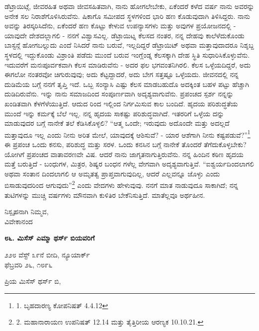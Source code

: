 ಡೆಟ್ರಾಯಿಟ್ಗೆ, ಜೀವರಹಿತ ಅಥವಾ ಜೀವಸಹಿತವಾಗಿ, ನಾನು ಹೋಗಲೇಬೇಕು, ಏಕೆಂದರೆ ಕಳೆದ ವರ್ಷ ನಾನು ಅವರನ್ನು ಅನೇಕ ಸಲ ನಿರಾಶೆಗೊಳಿಸಿರುವೆನು. ಷಿಕಾಗೊ ಸಮೀಪದ ಸ್ಥಳಗಳಿಂದ ಭಾರಿ ಹಣ ಕೊಡುವುದಾಗಿ ತಿಳಿಸಿದ್ದರು. ನಾನು ಅವನ್ನು ತಿರಸ್ಕರಿಸಿದೆನು, ಏಕೆಂದರೆ ಹಣ ಕೊಟ್ಟು ಕೇಳುವ ಉಪನ್ಯಾಸಗಳು ಮತ್ತು ಅವುಗಳ ಪ್ರಯೋಜನದಲ್ಲಿ - ಯಾವುದೇ ದೇಶದಲ್ಲಾಗಲಿ - ನನಗೆ ವಿಶ್ವಾಸವಿಲ್ಲ. ಡೆಟ್ರಾಯಿಟ್ನ ಕೆಲಸದ ನಂತರ, ನನ್ನ ದೇಹವು ಕಾಲೆಳೆದುಕೊಂಡು ಬಾಸ್ಟನ್ಗೆ ಹೋಗಬಲ್ಲುದು ಎಂದೆ ನಿಸಿದರೆ ನಾನು ಬರುವೆ, ಇಲ್ಲದಿದ್ದರೆ ಡೆಟ್ರಾಯಿಟ್ ಅಥವಾ ಮತ್ತಾವುದಾದರೂ ನಿಶ್ಶಬ್ದ ಸ್ಥಳದಲ್ಲಿ ಇದ್ದುಕೊಂಡು ವಿಶ್ರಾಂತಿ ಪಡೆದು ಮುಂದೆ ಬರುವ ಇಂಗ್ಲೆಂಡ್ನ ಕೆಲಸಕ್ಕಾಗಿ ದೇಹ ಸ್ಥಿತಿ ಸುಧಾರಿಸಿಕೊಳ್ಳುವೆನು. ಇದುವರೆಗೆ ಮನಃಪೂರ್ವಕವಾಗಿ ಕೆಲಸ ಮಾಡಿರುವೆನು - ಅದರ ಫಲ ಭಗವಂತನಿಗಿರಲಿ. ಕೆಲಸ ಒಳ್ಳೆಯದಿದ್ದರೆ, ಅದು ಈಗಲೋ ನಂತರವೋ ಚಿಗುರುವುವು; ಅದು ಕೆಟ್ಟದ್ದಾದರೆ, ಅದು ಬೇಗ ಸತ್ತಷ್ಟೂ ಒಳ್ಳೆಯದು. ಜೀವನದಲ್ಲಿ ನನ್ನ ದುಡಿಮೆಯ ಬಗ್ಗೆ ನನಗೆ ತೃಪ್ತಿ ಇದೆ. ಒಬ್ಬ ಸಂನ್ಯಾಸಿ ಎಷ್ಟು ಕೆಲಸ ಮಾಡಬಹುದೊ ಅದಕ್ಕಿಂತ ಬಹಳ ಪಟ್ಟು ಹೆಚ್ಚಾಗಿ ದುಡಿದಿರುವೆನು. ಇನ್ನು ನಾನು ಸಮಾಜದಿಂದ ಸಂಪೂರ್ಣವಾಗಿ ಅದೃಶ್ಯವಾಗುವೆನು. ಪ್ರಪಂಚದ ಸ್ಪರ್ಶ ನನ್ನನ್ನು ಖಂಡಿತವಾಗಿ ಕೆಳಗೆಳೆಯುತ್ತಿದೆ. ಆದುದ ರಿಂದ ಇಲ್ಲಿಂದ ನಿರ್ಗಮಿಸುವ ಕಾಲ ಬಂದಿದೆ. ಹೃದಯ ಪರಿಶುದ್ಧತೆಯ ಮುಂದೆ ಇನ್ನು ಕರ್ಮಕ್ಕೆ ಬೆಲೆ ಇಲ್ಲ. ನನ್ನ ಹೃದಯ ಸಾಕಷ್ಟು ಪರಿಶುದ್ಧವಾಗಿದೆ. ಇತರರಿಗೆ ಒಳ್ಳೆಯ ದನ್ನು ಮಾಡುವುದರ ಬಗ್ಗೆ ನಾನೇಕೆ ತಲೆ ಕೆಡಿಸಿಕೊಳ್ಳಲಿ? “ಆತ್ಮ ಒಂದೇ; ಇರುವುದು ಅದೊಂದೇ ಮತ್ತು ಅದಲ್ಲದೆ ಮತ್ತಾವುದೂ ಇಲ್ಲ ಎಂದು ನೀನು ಅರಿತ ಮೇಲೆ, ಯಾವುದಕ್ಕೆ ಆಶಿಸುವೆ? - ಯಾರ ಆಶೆಗಾಗಿ ನೀನು ಕಷ್ಟಪಡುವೆ?”\footnote{1. ಬೃಹದಾರಣ್ಯ ಕೋಪನಿಷತ್ 4.4.12} ಈ ಪ್ರಪಂಚ ಒಂದು ಕನಸು, ಪರಿಶುದ್ಧ ಮತ್ತು ಸರಳ. ಒಂದು ಕನಸಿನ ಬಗ್ಗೆ ನಾನೇಕೆ ತೊಂದರೆ ತೆಗೆದುಕೊಳ್ಳಬೇಕು? ಯೋಗಿಗೆ ಪ್ರಪಂಚದ ವಾತಾವರಣವೇ ವಿಷ. ಆದರೆ ನಾನು ಜಾಗೃತನಾಗುತ್ತಿರುವೆನು. ನನ್ನ ಹಿಂದಿನ ಕಠಿಣ ಹೃದಯ ಮತ್ತೆ ಬರುತ್ತಿದೆ - ಬಂಧುಗಳ, ಮಿತ್ರರ, ಶಿಷ್ಯರ ಬಂಧನ ಗಳೆಲ್ಲ ವೇಗವಾಗಿ ಅದೃಶ್ಯವಾಗುತ್ತಿವೆ. “ಐಶ್ವರ್ಯದಿಂದಲಾಗಲಿ ಅಥವಾ ಸಂತಾನ ದಿಂದಲಾಗಲಿ ಆ ಅಮೃತತ್ವ ಪ್ರಾಪ್ತವಾಗುವುದಿಲ್ಲ, ಆದರೆ ಎಲ್ಲವನ್ನೂ ಜೊಳ್ಳು ಎಂದು ಬಿಸಾಡುವುದರಿಂದ ಆಗುವುದು”\footnote{2. ಮಹಾನಾರಾಯಣ ಉಪನಿಷತ್ 12.14 ಮತ್ತು ತೈತ್ತಿರೀಯ ಆರಣ್ಯಕ 10.10.21.} ಎಂದು ವೇದಗಳು ಹೇಳುವುವು. ನನಗೆ ಮಾತ ನಾಡುವುದೂ ಸಾಕಾಗಿದೆ; ನನ್ನ ತುಟಿಗಳನ್ನು ಮುಚ್ಚಿ ವರ್ಷಗಳು ಮೌನವಾಗಿ ಕುಳಿತಿರ ಬೇಕೆನಿಸುತ್ತಿದೆ. ಮಾತೆಲ್ಲವೂ ಅರ್ಥಹೀನ.

\begin{flushright}
ನಿಸ್ಪೃಹನಾಗಿ ನಿಮ್ಮವ,\\ವಿವೇಕಾನಂದ
\end{flushright}

\begin{center}
\textbf{೮೬. ಮಿಸೆಸ್ ಎಮ್ಮಾ ಥರ್ಸ್ ಬಿಯವರಿಗೆ}
\end{center}

\begin{flushright}
೨೨೮ ವೆಸ್ಟ್ ೩೯ನೆ ಬೀದಿ, ನ್ಯೂಯಾರ್ಕ್\\ಫೆಬ್ರವರಿ ೨೬, ೧೮೯೬
\end{flushright}

ಪ್ರಿಯ ಮಿಸೆಸ್ ಥರ್ಸ್ ಬಿ,

